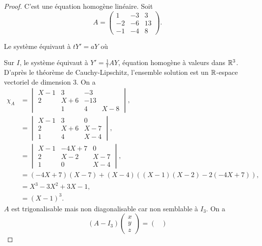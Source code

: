 \documentclass[12pt]{article}
\begin{document}
\begin{proof}
	C'est une équation homogène linéaire. Soit 
	\begin{equation*}
		A=
		\begin{pmatrix}
			1&-3&3\\
			-2&-6&13\\
			-1&-4&8
		\end{pmatrix}.
	\end{equation*}

	Le système équivaut à $tY'=aY$ où 

	Sur $I$, le système équivaut à $Y'=\frac{1}{t}AY$, équation homogène à valeurs dans $\mathbb{R}^{3}$. D'après le théorème de Cauchy-Lipschitz, l'ensemble solution est un $\mathbb{R}$-espace vectoriel de dimension 3. On a 
	\begin{align*}
		\chi_{A}
		&=
		\begin{vmatrix}
			X-1&3&-3\\
			2&X+6&-13\\
			&1&4&X-8
		\end{vmatrix},\\
		&=
		\begin{vmatrix}
			X-1 &3&0\\
			2&X+6&X-7\\
			1&4&X-4	
		\end{vmatrix},\\
		&=
		\begin{vmatrix}
			X-1 &-4X+7&0\\
			2&X-2&X-7\\
			1&0&X-4
		\end{vmatrix},\\
		&=(-4X+7)(X-7)+(X-4)\left((X-1)(X-2)-2(-4X+7)\right),\\
		&=X^{3}-3X^{2}+3X-1,\\
		&=(X-1)^{3}.
	\end{align*}
	$A$ est trigonalisable mais non diagonalisable car non semblable à $I_{3}$. On a 
	\begin{equation*}
		(A-I_3)\begin{pmatrix}
			x\\y\\z
		\end{pmatrix}=\begin{pmatrix}

\end{pmatrix}
\end{equation*}
\end{proof}
\end{document}
